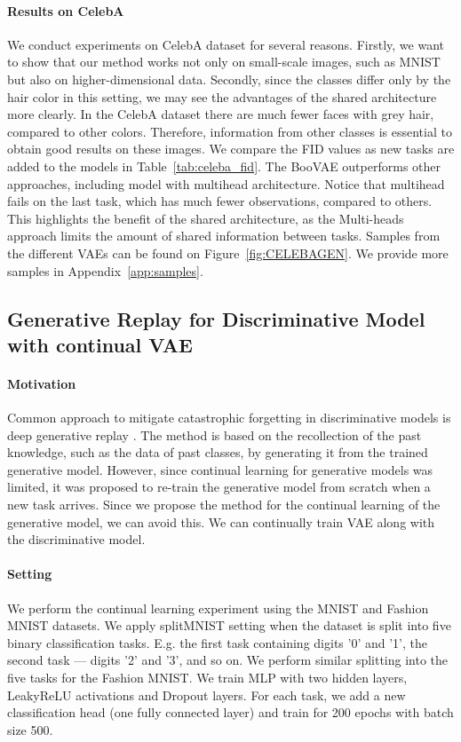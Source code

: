 \paragraph{Results on CelebA} We conduct experiments on CelebA dataset for several reasons. Firstly, we want to show that our method works not only on small-scale images, such as MNIST but also on higher-dimensional data. Secondly, since the classes differ only by the hair color in this setting, we may see the advantages of the shared architecture more clearly. In the CelebA dataset there are much fewer faces with grey hair, compared to other colors. Therefore, information from other classes is essential to obtain good results on these images. We compare the FID values as new tasks are added to the models in Table~\ref{tab:celeba_fid}. The BooVAE outperforms other approaches, including model with multihead architecture. Notice that multihead fails on the last task, which has much fewer observations, compared to others. This highlights the benefit of the shared architecture, as  the Multi-heads approach limits the amount of shared information between tasks. Samples from the different VAEs can be found on Figure~\ref{fig:CELEBAGEN}. We provide more samples in Appendix~\ref{app:samples}.
\subsection{Generative Replay for Discriminative Model with continual VAE}
\paragraph{Motivation} Common approach to mitigate catastrophic forgetting in discriminative models is deep generative replay \citep{shin2017continual}. The method is based on the recollection of the past knowledge, such as the data of past classes, by generating it from the trained generative model. However, since continual learning for generative models was limited, it was proposed to re-train the generative model from scratch when a new task arrives. Since we propose the method for the continual learning of the generative model, we can avoid this. We can continually train VAE along with the discriminative model.
\paragraph{Setting} We perform the continual learning experiment using the MNIST and Fashion MNIST datasets. We apply splitMNIST setting when the dataset is split into five binary classification tasks. E.g. the first task containing digits ’0’ and ’1’, the second task --- digits ’2’ and ’3’, and so on. We perform similar splitting into the five tasks for the Fashion MNIST. We train MLP  with two hidden layers, LeakyReLU activations and Dropout layers. For each task, we add a new classification head (one fully connected layer) and train for 200 epochs with batch size 500.  

